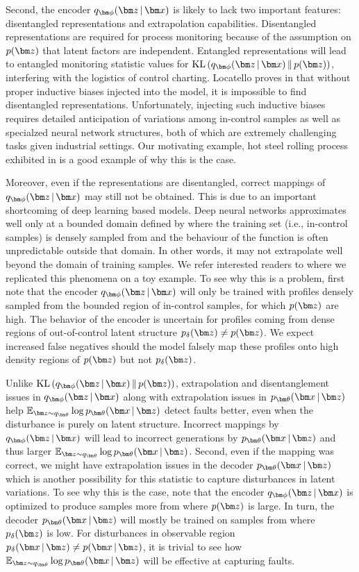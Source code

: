 \documentclass{scrartcl}
\theoremstyle{definition}
\let\ref\Cref
\begin{document}
Second, the encoder $\encoding$ is likely to lack two important features: disentangled representations and extrapolation capabilities. 
Disentangled representations are required for process monitoring because of the assumption on $\pz$ that latent factors are independent.
Entangled representations will lead to entangled monitoring statistic values for $\KL{\encoding}{p(\mbz)}$, interfering with the logistics of control charting.
Locatello \etal proves in \parencite[Thm. 1]{locatello2018challenging} that without proper inductive biases injected into the model, it is impossible to find disentangled representations.
Unfortunately, injecting such inductive biases requires detailed anticipation of variations among in-control samples as well as specialzed neural network structures, both of which are extremely challenging tasks given industrial settings.
Our motivating example, hot steel rolling process exhibited in \ref{fig:Rolling} is a good example of why this is the case.

Moreover, even if the representations are disentangled, correct mappings of $\encoding$ may still not be obtained.
This is due to an important shortcoming of deep learning based models. 
Deep neural networks approximates well only at a bounded domain defined by where the training set (i.e., in-control samples) is densely sampled from and the behaviour of the function is often unpredictable outside that domain. 
In other words, it may not extrapolate well beyond the domain of training samples.
We refer interested readers to \ref{app:rosenbrock} where we replicated this phenomena on a toy example.
To see why this is a problem, first note that the encoder $\encoding$ will only be trained with profiles densely sampled from the bounded region of in-control samples, for which $\pz$ are high.
The behavior of the encoder is uncertain for profiles coming from dense regions of out-of-control latent structure $p_{\delta}(\mbz)\neq\pz$.
We expect increased false negatives should the model falsely map these profiles onto high density regions of $\pz$ but not $p_{\delta}(\mbz)$.

Unlike $\KL{\encoding}{p(\mbz)}$, extrapolation and disentanglement issues in $\encoding$ along with extrapolation issues in $\decoding$ help $\E_{\mbz \sim q_{\mbtheta}} \log \decoding$ detect faults better, even when the disturbance is purely on latent structure.
Incorrect mappings by $\encoding$ will lead to incorrect generations by $\decoding$ and thus larger $\E_{\mbz \sim q_{\mbtheta}} \log \decoding$.
Second, even if the mapping was correct, we might have extrapolation issues in the decoder $\decoding$ which is another possibility for this statistic to capture disturbances in latent variations.
To see why this is the case, note that the encoder $\encoding$ is optimized to produce samples more from where $\pz$ is large. 
In turn, the decoder $\decoding$ will mostly be trained on samples from where $p_{\delta}(\mbz)$ is low. 
For disturbances in observable region $p_{\delta}(\mbx\g\mbz) \neq p(\mbx\g\mbz)$, it is trivial to see how $\E_{\mbz \sim q_{\mbtheta}} \log \decoding$ will be effective at capturing faults.
\end{document}
